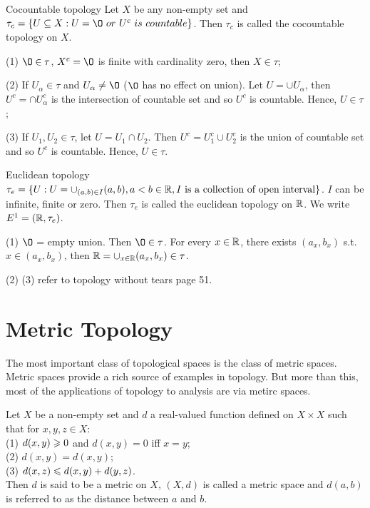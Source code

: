 \begin{example}{Cocountable topology}{}
    Let $X$ be any non-empty set and $\tau_c = \{U\subseteq X: U=\O \ or \ U^{c}\ is \ countable\}$.
        Then $\tau_c$ is called the cocountable topology on $X$.
\end{example}
(1) $\O\in\tau$, $X^c=\O$ is finite with cardinality zero, then $X\in\tau$;
\par
(2) If $U_{\alpha}\in\tau$ and $U_{\alpha}\neq\O$ ($\O$ has no effect on union).
Let $U=\cup U_{\alpha}$, then $U^c=\cap U_{\alpha}^c$ is the intersection of countable set and so $U^c$ is countable.
Hence, $U\in\tau$;
\par
(3) If $U_1,U_2\in\tau$, let $U=U_1\cap U_2$. Then $U^c=U_1^c\cup U_2^c$ is the union of countable set and so $U^c$ is countable.
Hence, $U\in\tau$. 

\begin{example}{Euclidean topology}{}
    $\tau_e = \{U : U=\cup_{(a,b)\in I} (a,b), a<b\in \mathbb{R}, I \text{ is a collection of open interval}\}$. $I$ can be infinite, finite or zero.
        Then $\tau_e$ is called the euclidean topology on $\mathbb{R}$. We write $E^1=(\mathbb{R},\tau_e)$.
\end{example}
(1) $\O$ = empty union. Then $\O\in \tau$. 
For every $x\in \mathbb{R}$, there exists $(a_x,b_x)$ s.t. $x\in(a_x,b_x)$, 
then $\mathbb{R}=\cup_{x\in\mathbb{R}}(a_x,b_x)\in\tau$.
\par
(2) (3) refer to topology without tears page 51.

\section{Metric Topology}

The most important class of topological spaces is the class of metric spaces.
Metric spaces provide a rich source of examples in topology. But more than this, 
most of the applications of topology to analysis are via metirc spaces.

\begin{definition}{}{}
    Let $X$ be a non-empty set and $d$ a real-valued function defined on $X\times X$ such that for $x,y,z\in X$:
    \\
    (1) $d(x,y)\geqslant 0$ and $d(x,y)=0$ iff $x=y$;\\
    (2) $d(x,y)=d(x,y)$;\\
    (3) $d(x,z)\leqslant d(x,y) + d(y,z)$.\\
    Then $d$ is said to be a metric on $X$, $(X,d)$ is called a metric space and $d(a,b)$ is referred to as the distance between $a$ and $b$.
\end{definition}

